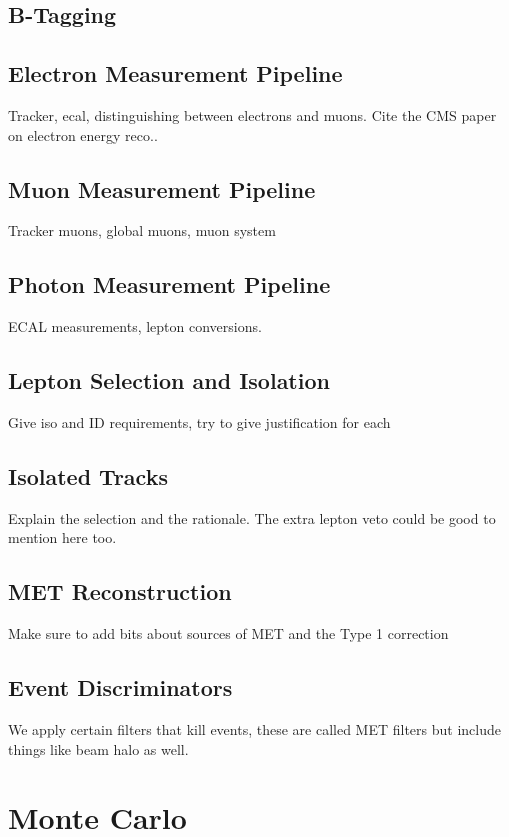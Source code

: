 \subsection{B-Tagging}
\subsection{Electron Measurement Pipeline} \label{sec:electron_measurement_pipeline}
Tracker, ecal, distinguishing between electrons and muons. Cite the CMS paper on electron energy reco..
\subsection{Muon Measurement Pipeline} \label{sec:muon_measurement_pipeline}
Tracker muons, global muons, muon system
\subsection{Photon Measurement Pipeline}
ECAL measurements, lepton conversions.
\subsection{Lepton Selection and Isolation}
Give iso and ID requirements, try to give justification for each
\subsection{Isolated Tracks}
Explain the selection and the rationale. The extra lepton veto could be good to mention here too. 
\subsection{MET Reconstruction} \label{sec:MET_reco}
  Make sure to add bits about sources of MET and the Type 1 correction
\subsection{Event Discriminators}
  We apply certain filters that kill events, these are called MET filters but include things like beam halo as well.

\section{Monte Carlo}